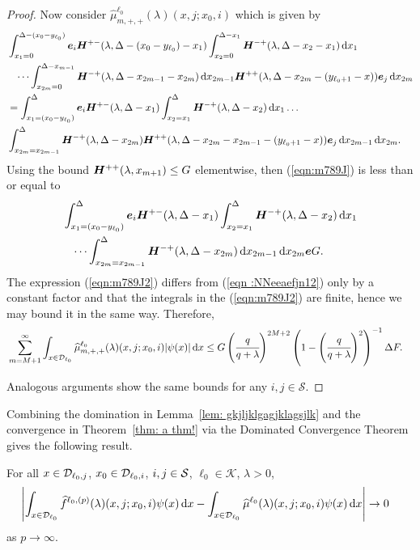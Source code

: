 \begin{proof}
	Now consider \(\widehat\mu_{m,+,+}^{\ell_0}(\lambda)( x,j;x_0,i) \) which is given by 
	\begin{align}
	\nonumber& \int_{x_1 = 0}^{\Delta-(x_0-y_{\ell_0})} \boldsymbol e_i\boldsymbol H^{+-}(\lambda,\Delta-(x_0-y_{\ell_0})-x_1) \int_{x_2 = 0}^{\Delta-x_1} \boldsymbol H^{-+}(\lambda,\Delta - x_2-x_1) \, \mathrm{d} x_1 
	\\\nonumber &\quad\dots  
	\int_{x_{2m}=0}^{\Delta-x_{m-1}} \boldsymbol H^{-+}(\lambda,\Delta -x_{2m-1} - x_{2m}) \, \mathrm{d} x_{2m-1}
		\boldsymbol H^{++}(\lambda,\Delta -x_{2m}- (y_{\ell_0+1}- x))\boldsymbol e_j\, \mathrm{d} x_{2m}
	\\\nonumber&= \int_{x_1 = (x_0-y_{\ell_0})}^{\Delta} \boldsymbol e_i \boldsymbol H^{+-}(\lambda,\Delta-x_1) \int_{x_2 = x_1}^{\Delta} \boldsymbol H^{-+}(\lambda,\Delta -x_2) \, \mathrm{d} x_1 
	\dots  
	\\&\int_{x_{2m}=x_{2m-1}}^{\Delta} \boldsymbol H^{-+}(\lambda,\Delta - x_{2m}) 
	\boldsymbol H^{++}(\lambda,\Delta -x_{2m}-x_{2m-1}- (y_{\ell_0+1}- x))\boldsymbol e_j 
	\, \mathrm{d} x_{2m-1}\, \mathrm{d} x_{2m}.\label{eqn:m789J}
	\end{align}
	Using the bound \(\boldsymbol H^{++}(\lambda,x_{m+1})\leq G\) elementwise, then (\ref{eqn:m789J}) is less than or equal to 
	\begin{align}
		&\int_{x_1 = (x_0-y_{\ell_0})}^{\Delta} \boldsymbol e_i\boldsymbol H^{+-}(\lambda,\Delta-x_1) \int_{x_2 = x_1}^{\Delta} \boldsymbol H^{-+}(\lambda,\Delta -x_2) \, \mathrm{d} x_1 \nonumber
		\\&\quad\dots  
		\int_{x_{2m}=x_{2m-1}}^{\Delta} \boldsymbol H^{-+}(\lambda,\Delta - x_{2m})  
		\, \mathrm{d} x_{2m-1}\, \mathrm{d} x_{2m}\boldsymbol e G.\label{eqn:m789J2}
	\end{align}
	The expression (\ref{eqn:m789J2}) differs from (\ref{eqn :NNeeaefjn12}) only by a constant factor and that the integrals in the (\ref{eqn:m789J2}) are finite, hence we may bound it in the same way. Therefore, 
	\begin{align}
		& \sum_{m=M+1}^\infty \int_{x\in\mathcal{D}_{\ell_0}} \widehat \mu^{\ell_0}_{m,+,+}(\lambda)(x,j;x_0,i) |\psi(x)|\, \mathrm{d} x \nonumber
		\leq G\left(\cfrac{q}{q+\lambda}\right)^{2M+2} \left(1-\left(\cfrac{q}{q+\lambda}\right)^2\right)^{-1}\Delta F.
	\end{align}
        
	Analogous arguments show the same bounds for any \(i,j\in\mathcal S\). 
\end{proof}

Combining the domination in Lemma~\ref{lem: gkjljklgagjklagsjlk} and the convergence in Theorem~\ref{thm: a thm!} via the Dominated Convergence Theorem gives the following result. 
\begin{lem} \label{lem:vn4}
	For all \(x\in\mathcal{D}_{\ell_0,j}\), \(x_0\in\mathcal{D}_{\ell_0,i}\), \(i,j\in\mathcal{S}\), \(\ell_0\in\mathcal K\), \(\lambda > 0\),  
	\begin{align}
		&\left|\int_{x\in\mathcal{D}_{\ell_0}}\widehat f^{\ell_0,(p)}(\lambda)(x,j;x_0,i)\psi(x) \, \mathrm{d} x - \int_{x\in\mathcal{D}_{\ell_0}}\widehat \mu^{\ell_0}(\lambda)( x,j; x_0,i)\psi(x) \, \mathrm{d} x\right|\to 0  \label{eqn: akhv}
	\end{align}
	as \(p\to\infty\). 
\end{lem}
	 
